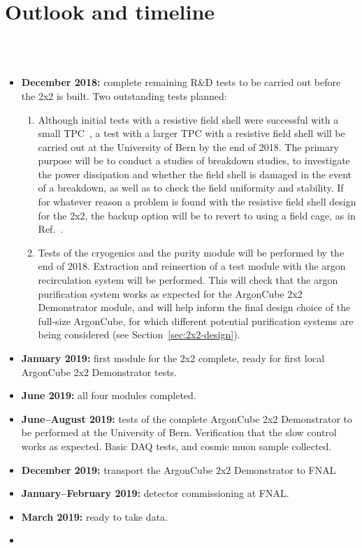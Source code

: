 \section{Outlook and timeline}
\label{sec:outlook}

\\
\\
\begin{itemize}
\item {\bf December 2018:} complete remaining R\&D tests to be carried out before the 2x2 is built. Two outstanding tests planned:
  \begin{enumerate}
  \item Although initial tests with a resistive field shell were successful with a small TPC~\cite{argoncube_fd}, a test with a larger TPC with a resistive field shell will be carried out at the University of Bern by the end of 2018. The primary purpose will be to conduct a studies of breakdown studies, to investigate the power dissipation and whether the field shell is damaged in the event of a breakdown, as well as to check the field uniformity and stability. If for whatever reason a problem is found with the resistive field shell design for the 2x2, the backup option will be to revert to using a field cage, as in Ref.~\cite{argoncube_loi}.
  \item Tests of the cryogenics and the purity module will be performed by the end of 2018. Extraction and reinsertion of a test module with the argon recirculation system will be performed. This will check that the argon purification system works as expected for the ArgonCube 2x2 Demonstrator module, and will help inform the final design choice of the full-size ArgonCube, for which different potential purification systems are being considered (see Section~\ref{sec:2x2-design}).
  \end{enumerate}
\item {\bf January 2019:} first module for the 2x2 complete, ready for first local ArgonCube 2x2 Demonstrator tests.
\item {\bf June 2019:} all four modules completed.
\item {\bf June--August 2019:} tests of the complete ArgonCube 2x2 Demonstrator to be performed at the University of Bern. Verification that the slow control works as expected. Basic DAQ tests, and cosmic muon sample collected.
\item {\bf December 2019:} transport the ArgonCube 2x2 Demonstrator to FNAL
\item {\bf January--February 2019:} detector commissioning at FNAL.
\item {\bf March 2019:} ready to take data.
\item {}
\end{itemize}
